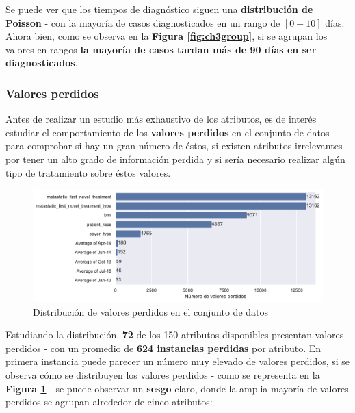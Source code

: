 Se puede ver que los tiempos de diagnóstico siguen una \textbf{distribución de Poisson} - con la mayoría de casos diagnosticados en un rango de $[0-10]$ días. Ahora bien, como se observa en la \textbf{Figura \ref{fig:ch3group}}, si se agrupan los valores en rangos \textbf{la mayoría de casos tardan más de 90 días en ser diagnosticados}.

\subsubsection{Valores perdidos}

Antes de realizar un estudio más exhaustivo de los atributos, es de interés estudiar el comportamiento de los \textbf{valores perdidos} en el conjunto de datos - para comprobar si hay un gran número de éstos, si existen atributos irrelevantes por tener un alto grado de información perdida y si sería necesario realizar algún tipo de tratamiento sobre éstos valores.

\begin{figure}[h]
	\centering
	\includegraphics[width=0.9\linewidth]{figs/chapter3/missingvalues}
	\captionsetup{belowskip=-15pt}
	\caption{Distribución de valores perdidos en el conjunto de datos}
	\label{fig:ch3missingvalues}
\end{figure}

Estudiando la distribución, \textbf{72} de los 150 atributos disponibles presentan valores perdidos - con un promedio de \textbf{624 instancias perdidas} por atributo. En primera instancia puede parecer un número muy elevado de valores perdidos, si se observa cómo se distribuyen los valores perdidos - como se representa en la \textbf{Figura \ref{fig:ch3missingvalues}} - se puede observar un \textbf{sesgo} claro, donde la amplia mayoría de valores perdidos se agrupan alrededor de cinco atributos:

